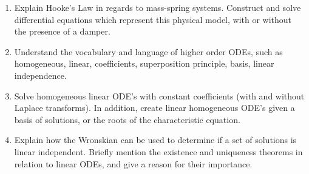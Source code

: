 

\begin{enumerate}
	\item Explain Hooke's Law in regards to mass-spring systems. Construct and solve differential equations which represent this physical model, with or without the presence of a damper.  
	\item Understand the vocabulary and language of higher order ODEs, such as homogeneous, linear, coefficients, superposition principle, basis, linear independence. 
	\item Solve homogeneous linear ODE's with constant coefficients (with and without Laplace transforms). In addition, create linear homogeneous ODE's given a basis of solutions, or the roots of the characteristic equation.
	\item Explain how the Wronskian can be used to determine if a set of solutions is linear independent.	Briefly mention the existence and uniqueness theorems in relation to linear ODEs, and give a reason for their importance.
\end{enumerate}

